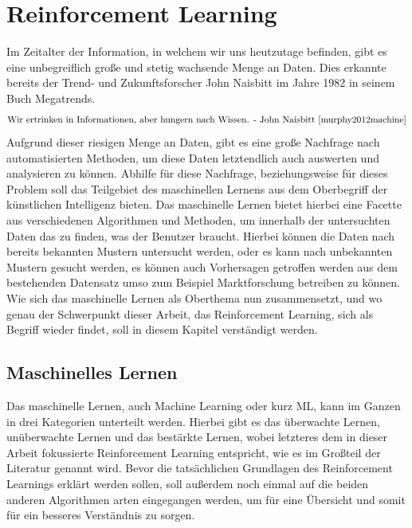 \documentclass[]{iat}
\begin{document}
\chapter{Reinforcement Learning} \label{sec:reinforcement_learning}
Im Zeitalter der Information, in welchem wir uns heutzutage befinden, gibt es eine unbegreiflich große und stetig wachsende Menge an Daten. Dies erkannte bereits der Trend- und Zukunftsforscher John Naisbitt im Jahre 1982 in seinem Buch Megatrends.
\begin{align*}
    \text{Wir ertrinken in Informationen, aber hungern nach Wissen. - John Naisbitt \cite[]{murphy2012machine}}
\end{align*}
Aufgrund dieser riesigen Menge an Daten, gibt es eine große Nachfrage nach automatisierten Methoden, um diese Daten letztendlich auch auswerten und analysieren zu können. Abhilfe für diese Nachfrage, beziehungsweise für dieses Problem soll das Teilgebiet des maschinellen Lernens aus dem Oberbegriff der künstlichen Intelligenz bieten. Das maschinelle Lernen bietet hierbei eine Facette aus verschiedenen Algorithmen und Methoden, um innerhalb der untersuchten Daten das zu finden, was der Benutzer braucht. Hierbei können die Daten nach bereits bekannten Mustern untersucht werden, oder es kann nach unbekannten Mustern gesucht werden, es können auch Vorhersagen getroffen werden aus dem bestehenden Datensatz umso zum Beispiel Marktforschung betreiben zu können. Wie sich das maschinelle Lernen als Oberthema nun zusammensetzt, und wo genau der Schwerpunkt dieser Arbeit, das Reinforcement Learning, sich als Begriff wieder findet, soll in diesem Kapitel verständigt werden.

\section{Maschinelles Lernen} \label{sec:machine_learning}
Das maschinelle Lernen, auch Machine Learning oder kurz ML, kann im Ganzen in drei Kategorien unterteilt werden. Hierbei gibt es das überwachte Lernen, unüberwachte Lernen und das bestärkte Lernen, wobei letzteres dem in dieser Arbeit fokussierte Reinforcement Learning entspricht, wie es im Großteil der Literatur genannt wird. \cite[]{Sutton1998} Bevor die tatsächlichen Grundlagen des Reinforcement Learnings erklärt werden sollen, soll außerdem noch einmal auf die beiden anderen Algorithmen arten eingegangen werden, um für eine Übersicht und somit für ein besseres Verständnis zu sorgen.
\end{document}
